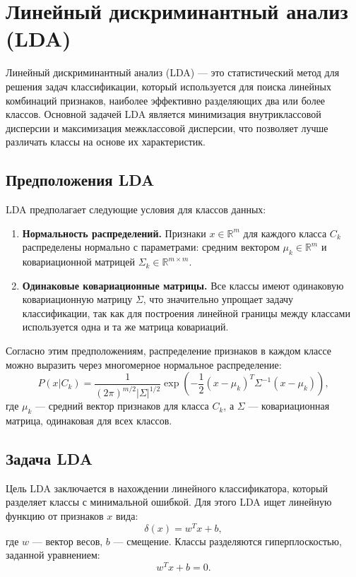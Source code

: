 \section*{Линейный дискриминантный анализ (LDA)}

Линейный дискриминантный анализ (LDA) — это статистический метод для решения задач классификации, который используется для поиска линейных комбинаций признаков, наиболее эффективно разделяющих два или более классов. Основной задачей LDA является минимизация внутриклассовой дисперсии и максимизация межклассовой дисперсии, что позволяет лучше различать классы на основе их характеристик.

\subsection*{Предположения LDA}

LDA предполагает следующие условия для классов данных:
\begin{enumerate}
    \item \textbf{Нормальность распределений.} Признаки \( x \in \mathbb{R}^m \) для каждого класса \( C_k \) распределены нормально с параметрами: средним вектором \( \mu_k \in \mathbb{R}^m \) и ковариационной матрицей \( \Sigma_k \in \mathbb{R}^{m \times m} \).
    \item \textbf{Одинаковые ковариационные матрицы.} Все классы имеют одинаковую ковариационную матрицу \( \Sigma \), что значительно упрощает задачу классификации, так как для построения линейной границы между классами используется одна и та же матрица ковариаций.
\end{enumerate}

Согласно этим предположениям, распределение признаков в каждом классе можно выразить через многомерное нормальное распределение:
\[
P(x | C_k) = \frac{1}{(2\pi)^{m/2} |\Sigma|^{1/2}} \exp\left( -\frac{1}{2} (x - \mu_k)^T \Sigma^{-1} (x - \mu_k) \right),
\]
где \( \mu_k \) — средний вектор признаков для класса \( C_k \), а \( \Sigma \) — ковариационная матрица, одинаковая для всех классов.

\subsection*{Задача LDA}

Цель LDA заключается в нахождении линейного классификатора, который разделяет классы с минимальной ошибкой. Для этого LDA ищет линейную функцию от признаков \( x \) вида:
\[
\delta(x) = w^T x + b,
\]
где \( w \) — вектор весов, \( b \) — смещение. Классы разделяются гиперплоскостью, заданной уравнением:
\[
w^T x + b = 0.
\]

